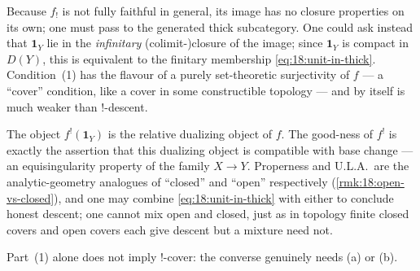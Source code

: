 \begin{remark}
\label{rmk:18:image-thick}
Because $f_!$ is not fully faithful in general, its image has no closure
properties on its own; one must pass to the generated thick subcategory. One could
ask instead that $\mathbf 1_Y$ lie in the \emph{infinitary} (colimit-)closure of
the image; since $\mathbf 1_Y$ is compact in $D(Y)$, this is equivalent to the
finitary membership \eqref{eq:18:unit-in-thick}. Condition~(1) has the flavour of a
purely set-theoretic surjectivity of $f$ --- a ``cover'' condition, like a cover in
some constructible topology --- and by itself is much weaker than $!$-descent.
\end{remark}

\begin{remark}
\label{rmk:18:ULA-meaning}
The object $f^!(\mathbf 1_Y)$ is the relative dualizing object of $f$. The good-ness
of $f^!$ is exactly the assertion that this dualizing object is compatible with
base change --- an equisingularity property of the family $X\to Y$. Properness and
U.L.A.\ are the analytic-geometry analogues of ``closed'' and ``open''
respectively (\cref{rmk:18:open-vs-closed}), and one may combine
\eqref{eq:18:unit-in-thick} with either to conclude honest descent; one cannot mix
open and closed, just as in topology finite closed covers and open covers each
give descent but a mixture need not.
\end{remark}

Part~(1) alone does not imply $!$-cover: the converse genuinely needs (a) or (b).

